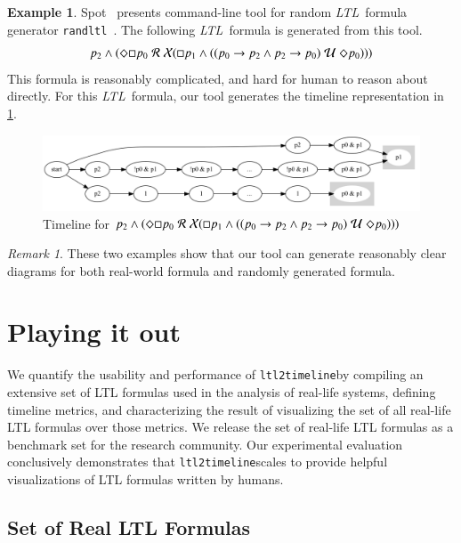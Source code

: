 \documentclass[preprint,12pt]{elsarticle}
\theoremstyle{definition}
\newtheorem{example}{Example}[section]
\theoremstyle{remark}
\newtheorem{remark}{Remark}[section]
\newcommand{\always}{\Box}
\newcommand{\eventually}{\Diamond}
\newcommand{\nextt}{\mathcal{X}}
\newcommand{\limplies}{\rightarrow}
\newcommand{\ltl}{\textit{LTL}}
\newcommand{\stronguntil}{\hspace{0.1cm} \mathcal{U}  \hspace{0.1cm}}
\newcommand{\weakrelease}{\hspace{0.1cm} \mathcal{R} \hspace{0.1cm}}
\newcommand{\tool}{\texttt{ltl2timeline}}
\begin{document}
\begin{example}
    Spot~\cite{SPOT-online} presents command-line tool for random \ltl\ formula generator \texttt{randltl}~\cite{duret.13.atva}. The following \ltl\ formula is generated from this tool.
    \[
    p_2 \land (\eventually \always p_0 \weakrelease \nextt(\always p_1 \land ((p_0 \limplies p_2 \land p_2 \limplies p_0) \stronguntil \eventually p_0)))
    \]
    This formula is reasonably complicated, and hard for human to reason about directly. For this \ltl\ formula, our tool generates the timeline representation in \cref{fig:ex13}.
    \begin{figure}[h!]
        \centering
        \includegraphics[scale=0.3]{examples/ex13/ex13.png}
        \caption{Timeline for $p_2 \land (\eventually \always p_0 \weakrelease \nextt(\always p_1 \land ((p_0 \limplies p_2 \land p_2 \limplies p_0) \stronguntil \eventually p_0)))$}
        \label{fig:ex13}
    \end{figure}
\end{example}
\begin{remark}
    These two examples show that our tool can generate reasonably clear diagrams for both real-world formula and randomly generated formula.
\end{remark}

\section{Playing it out} %

We quantify the usability and performance of \tool by compiling an extensive set of LTL formulas used in the analysis of real-life systems, defining timeline metrics, and characterizing the result of visualizing the set of all real-life LTL formulas over those metrics. We release the set of real-life LTL formulas as a benchmark set for the research community. Our experimental evaluation conclusively demonstrates that \tool scales to provide helpful visualizations of LTL formulas written by humans.

\subsection{Set of Real LTL Formulas}
\end{document}
